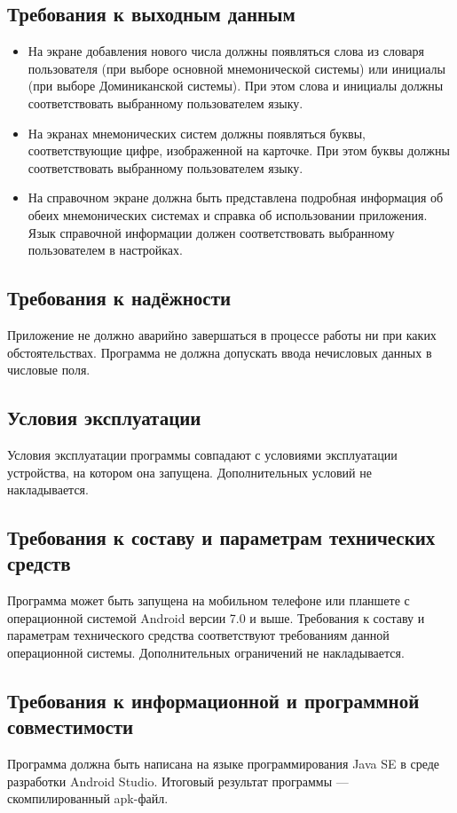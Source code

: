 \documentclass[draft]{article}
\begin{document}
\subsection{Требования к выходным данным}
\begin{itemize}
\item На экране добавления нового числа должны появляться слова из словаря пользователя (при выборе основной мнемонической системы) или инициалы (при выборе Доминиканской системы). При этом слова и инициалы должны соответствовать выбранному пользователем языку.
\item На экранах мнемонических систем должны появляться буквы, соответствующие цифре, изображенной на карточке. При этом буквы должны соответствовать выбранному пользователем языку.
\item На справочном экране должна быть представлена подробная информация об обеих мнемонических системах и справка об использовании приложения. Язык справочной информации должен соответствовать выбранному пользователем в настройках.
\end{itemize}
\subsection{Требования к надёжности}
Приложение не должно аварийно завершаться в процессе работы ни при каких обстоятельствах. Программа не должна допускать ввода нечисловых данных в числовые поля.
\subsection{Условия эксплуатации}
Условия эксплуатации программы совпадают с условиями эксплуатации устройства, на котором она запущена. Дополнительных условий не накладывается.
\subsection{Требования к составу и параметрам технических средств}
Программа может быть запущена на мобильном телефоне или планшете с операционной системой Android версии 7.0 и выше. Требования к составу и параметрам технического средства соответствуют требованиям данной операционной системы. Дополнительных ограничений не накладывается.
\subsection{Требования к информационной и программной совместимости}
Программа должна быть написана на языке программирования Java SE в среде разработки Android Studio. Итоговый результат программы — скомпилированный apk-файл.
\end{document}
